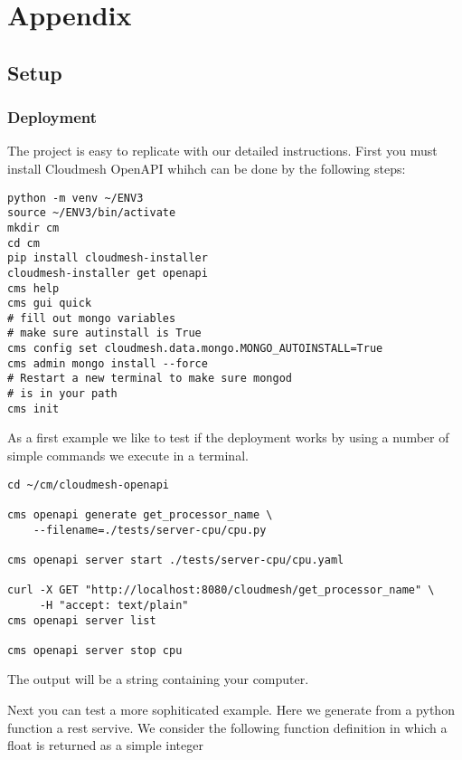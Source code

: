 \appendix

\section{Appendix}

\subsection{Setup}\label{appendix-a.---setup}

\subsubsection{Deployment}\label{a.1.-deployment}

The project is easy to replicate with our detailed instructions. First
you must install Cloudmesh OpenAPI whihch can be done by the following
steps:


\begin{verbatim}
python -m venv ~/ENV3
source ~/ENV3/bin/activate 
mkdir cm
cd cm
pip install cloudmesh-installer
cloudmesh-installer get openapi 
cms help
cms gui quick
# fill out mongo variables
# make sure autinstall is True
cms config set cloudmesh.data.mongo.MONGO_AUTOINSTALL=True
cms admin mongo install --force
# Restart a new terminal to make sure mongod 
# is in your path
cms init
\end{verbatim}
 

As a first example we like to test if the deployment works by using a
number of simple commands we execute in a terminal.

\begin{verbatim}
cd ~/cm/cloudmesh-openapi

cms openapi generate get_processor_name \
    --filename=./tests/server-cpu/cpu.py

cms openapi server start ./tests/server-cpu/cpu.yaml

curl -X GET "http://localhost:8080/cloudmesh/get_processor_name" \
     -H "accept: text/plain"
cms openapi server list

cms openapi server stop cpu
\end{verbatim}

The output will be a string containing your computer.


Next you can test a more sophiticated example. Here we generate from a
python function a rest servive. We consider the following function
definition in which a float is returned as a simple integer

